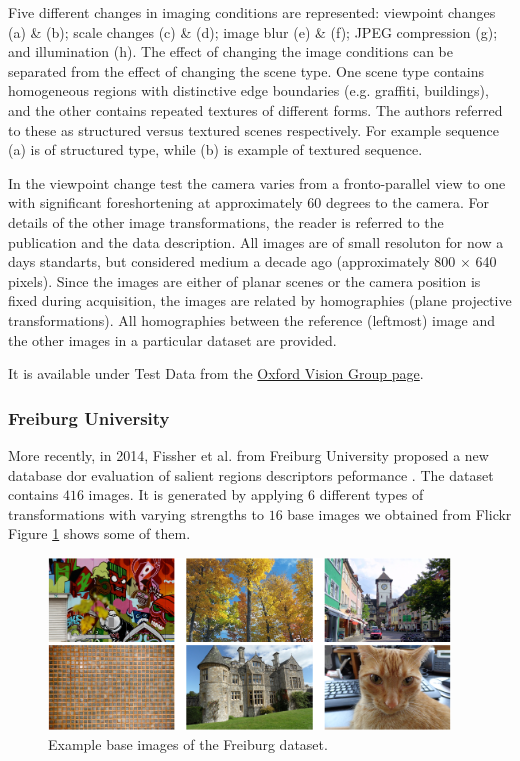  Five different changes in imaging conditions are represented: viewpoint changes (a) \& (b); scale changes (c) \& (d); image blur (e) \& (f); JPEG compression (g); and illumination (h). The effect of changing the image conditions can be separated from
the effect of changing the scene type. One scene type contains homogeneous regions with distinctive edge boundaries (e.g. graffiti, buildings), and the other contains
repeated textures of different forms. The authors referred to these as structured versus textured scenes respectively. For example sequence (a) is of structured type, while (b) is example of textured sequence.

In the viewpoint change test the camera varies from a fronto-parallel view to one with significant foreshortening
at approximately 60 degrees to the camera. For details of the other image transformations, the reader is referred to the publication \cite{Mikolajczyk:2005} and the data description.   All images are of small resoluton for now a days standarts, but considered medium a decade ago (approximately 800 $\times$ 640 pixels).
Since the images are either of planar scenes or the camera position is fixed during acquisition, the images are related by homographies (plane
projective transformations). All homographies between the reference (leftmost) image and the other images in a particular dataset are provided.

It is available under Test Data from the \href{http://www.robots.ox.ac.uk/~vgg/research/affine/index.html}{Oxford Vision Group page}.

\subsubsection{Freiburg University}
More recently, in 2014, Fissher et al. from Freiburg University  proposed a new database dor evaluation of salient regions descriptors peformance \cite{FischerDB14}. 
The dataset contains $416$ images. It is generated by applying $6$ different types of transformations with varying strengths to $16$ base images we obtained from Flickr
Figure \ref{fig:fischerDBdata} shows some of them.

\begin{figure}[H]
\begin{center}
\includegraphics[width=0.95\textwidth]{fig/MatchDBFreiburgBase}
\end{center}
\caption{Example base images of the Freiburg dataset.}
\label{fig:fischerDBdata}
\end{figure}


